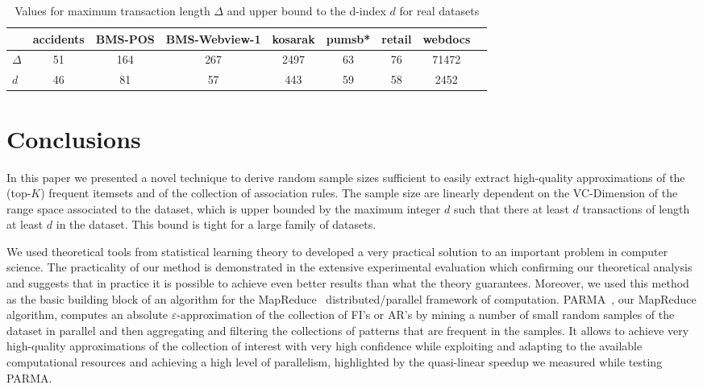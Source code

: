 \begin{table}[hbt]
\centering
\caption{Values for maximum transaction length $\Delta$ and upper bound to the
d-index $d$ for real datasets}
\label{tab:deltadrealds}

\begin{tabular}{lcccccccc}
  \toprule
  & accidents & BMS-POS & BMS-Webview-1 & kosarak & pumsb* & retail & webdocs \\
  \midrule
  $\Delta$ & 51 & 164 & 267 & 2497 & 63 & 76 & 71472 \\
  $d$ & 46 & 81 & 57 & 443 & 59 & 58 & 2452 \\ 
  \bottomrule
\end{tabular}
\end{table}

\section{Conclusions}\label{sec:concl}
In this paper we presented a novel technique to derive random sample sizes
sufficient to easily extract high-quality approximations of the (top-$K$)
frequent itemsets and of the collection of association rules. The sample size
are linearly dependent on the VC-Dimension of the range space associated to the
dataset, which is upper bounded by the maximum integer $d$ such
that there at least $d$ transactions of length at least $d$ in the dataset. This 
bound is tight for a large family of datasets.  

We used theoretical tools from statistical learning theory to developed a very
practical solution to an important problem in computer science. The practicality
of our method is demonstrated in the extensive experimental evaluation which
confirming our theoretical analysis and suggests that in practice it is possible
to achieve even better results than what the theory guarantees. Moreover, we
used this method as the basic building block of an algorithm for the
MapReduce~\citep{DeanS04} distributed/parallel framework of computation.
PARMA~\citep{RiondatoDFU12}, our MapReduce algorithm, computes an absolute
$\varepsilon$-approximation of the collection of FI's or AR's by mining a number
of small random samples of the dataset in parallel and then aggregating and
filtering the collections of patterns that are frequent in the samples. It
allows to achieve very high-quality approximations of the collection of interest
with very high confidence while exploiting and adapting to the available
computational resources and achieving a high level of parallelism, highlighted 
by the quasi-linear speedup we measured while testing PARMA.

